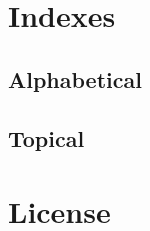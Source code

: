 \documentclass[oneside]{book}
\begin{document}

\backmatter
\part{Indexes}


\chapter{Alphabetical}


\chapter{Topical}


\part{License}
\end{document}
